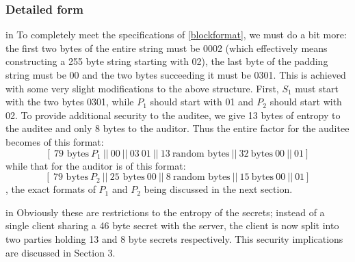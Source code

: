 \documentclass[10pt,a4paper]{article}
\begin{document}
\subsubsection{Detailed form}

 in
\noindent To completely meet the specifications of \eqref{blockformat}, we must do a bit more: the first two bytes of the entire string must be 0002 (which effectively means constructing a 255 byte string starting with 02), the last byte of the padding string must be 00 and the two bytes succeeding it must be 0301. This is achieved with some very slight modifications to the above structure. First, $S_1$ must start with the two bytes 0301, while $P_1$ should start with 01 and $P_2$ should start with 02. To provide additional security to the auditee, we give 13 bytes of entropy to the auditee and only 8 bytes to the auditor. Thus the entire factor for the auditee becomes of this format:
\begin{equation}\label{auditee_factor}
[ \ \textrm{79 bytes}\ P_1\ ||\ 00\ ||\ 03\ 01\ ||\ 13\ \textrm{random bytes}\ ||\ 32\ \textrm{bytes}\ 00\ ||\ 01 ] 
\end{equation}
while that for the auditor is of this format:
\begin{equation}\label{auditor_factor}
[ \ \textrm{79 bytes}\ P_2\ ||\ \textrm{25 bytes}\ 00\ ||\ 8\ \textrm{random bytes}\ ||\ 15\ \textrm{bytes}\ 00\ ||\ 01 ] 
\end{equation}
, the exact formats of $P_1$ and $P_2$ being discussed in the next section.

 in 
\noindent Obviously these are restrictions to the entropy of the secrets; instead of a single client sharing a 46 byte secret with the server, the client is now split into two parties holding 13 and 8 byte secrets respectively. This security implications are discussed in Section 3.  
\end{document}
